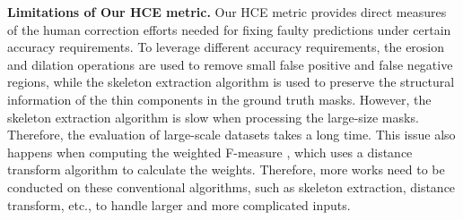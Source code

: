 \documentclass[10pt,twocolumn,letterpaper]{article}
\begin{document}
\noindent
\textbf{Limitations of Our HCE metric.} Our HCE metric provides direct measures of the human correction efforts needed for fixing faulty predictions under certain accuracy requirements. To leverage different accuracy requirements, the erosion \cite{haralick1987image} and dilation \cite{haralick1987image} operations are used to remove small false positive and false negative regions, while the skeleton extraction algorithm \cite{DBLP:journals/cacm/ZhangS84} is used to preserve the structural information of the thin components in the ground truth masks. However, the skeleton extraction algorithm is slow when processing the large-size masks. Therefore, the evaluation of large-scale datasets takes a long time. This issue also happens when computing the weighted F-measure \cite{Margolin2014HowTE}, which uses a distance transform algorithm \cite{DBLP:journals/cvgip/Borgefors86,DBLP:journals/toc/FelzenszwalbH12} to calculate the weights. Therefore, more works need to be conducted on these conventional algorithms, such as skeleton extraction, distance transform, etc., to handle larger and more complicated inputs.
\end{document}
